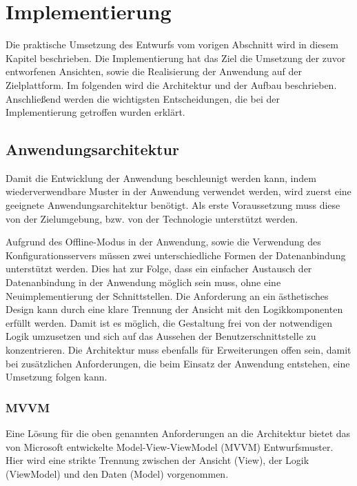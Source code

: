 \chapter{Implementierung}\label{chapter_5}
Die praktische Umsetzung des Entwurfs vom vorigen Abschnitt wird in diesem Kapitel beschrieben. Die Implementierung hat das Ziel die Umsetzung der zuvor entworfenen Ansichten, sowie die Realisierung der Anwendung auf der Zielplattform. Im folgenden wird die Architektur und der Aufbau beschrieben. Anschließend werden die wichtigsten Entscheidungen, die bei der Implementierung getroffen wurden erklärt.

\section{Anwendungsarchitektur}
Damit die Entwicklung der Anwendung beschleunigt werden kann, indem wiederverwendbare Muster in der Anwendung verwendet werden, wird zuerst eine geeignete Anwendungsarchitektur benötigt. Als erste Voraussetzung muss diese von der Zielumgebung, bzw. von der Technologie unterstützt werden. \par 

Aufgrund des Offline-Modus in der Anwendung, sowie die Verwendung des Konfigurationsservers müssen zwei unterschiedliche Formen der Datenanbindung unterstützt werden. Dies hat zur Folge, dass ein einfacher Austausch der Datenanbindung in der Anwendung möglich sein muss, ohne eine Neuimplementierung der Schnittstellen. Die Anforderung an ein ästhetisches Design kann durch eine klare Trennung der Ansicht mit den Logikkomponenten erfüllt werden. Damit ist es möglich, die Gestaltung frei von der notwendigen Logik umzusetzen und sich auf das Aussehen der Benutzerschnittstelle zu konzentrieren. Die Architektur muss ebenfalls für Erweiterungen offen sein, damit bei zusätzlichen Anforderungen, die beim Einsatz der Anwendung entstehen, eine Umsetzung folgen kann.

\subsection{MVVM}
Eine Lösung für die oben genannten Anforderungen an die Architektur bietet das von Microsoft entwickelte Model-View-ViewModel (MVVM) Entwurfsmuster. Hier wird eine strikte Trennung zwischen der Ansicht (View), der Logik (ViewModel) und den Daten (Model) vorgenommen. \par 

